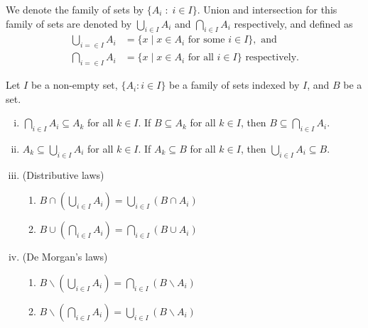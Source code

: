 \documentclass[a4paper,english,12pt]{article}
\begin{document}
We denote the family of sets by $\{A_{i} \;:\; i \in I\}$. Union and intersection for this family of sets are denoted by $\bigcup_{i \in I}A_{i}$ and $\bigcap_{i \in I}A_i$ respectively, and defined as
\begin{align*}
 \bigcup_{i = \in I}A_{i} &= \{x \; | \; x \in A_{i} \text{ for some } i \in I \}, \text{ and }\\
 \bigcap_{i = \in I}A_{i} &= \{x \; | \; x \in A_{i} \text{ for all } i \in I \} \text{ respectively}.
 \nonumber
\end{align*}

\begin{thm}
Let $I$ be a non-empty set, $\{ A_{i} : i \in I \}$ be a family of sets indexed by $I$, and $B$ be a set.
\begin{enumerate}[i)]
 \item $\displaystyle \bigcap_{i \in I} A_{i}  \subseteq A_{k}$ for all $k \in I$. If $B \subseteq A_{k}$ for all $k \in I$, then $B\displaystyle \subseteq \bigcap_{i \in I}A_{i}$.
 \item $A_{k} \subseteq \displaystyle \bigcup_{i \in I} A_{i}$ for all $k \in I$. If $A_{k} \subseteq B$ for all $k \in I$, then $\displaystyle \bigcup_{i \in I}A_{i} \subseteq B$. \\
 \item (Distributive laws) 
		\begin{enumerate}
			\item $\displaystyle B \cap \left( \bigcup_{i \in I}A_{i} \right) = \bigcup_{i \in I} \left( B \cap A_{i} \right)$
			\item $\displaystyle B \cup \left( \bigcap_{i \in I}A_{i} \right) = \bigcap_{i \in I} \left( B \cup A_{i} \right)$
		\end{enumerate}
 \item (De Morgan's laws) 
		\begin{enumerate}
			\item $B \backslash \left( \bigcup_{i \in I}A_{i} \right) = \bigcap_{i \in I} \left( B \backslash A_{i} \right)$
			\item $B \backslash \left(\bigcap_{i \in I}A_{i} \right) = \bigcup_{i \in I} \left( B \backslash A_{i} \right)$
 \end{enumerate}
\end{enumerate}
\end{thm}
\end{document}
